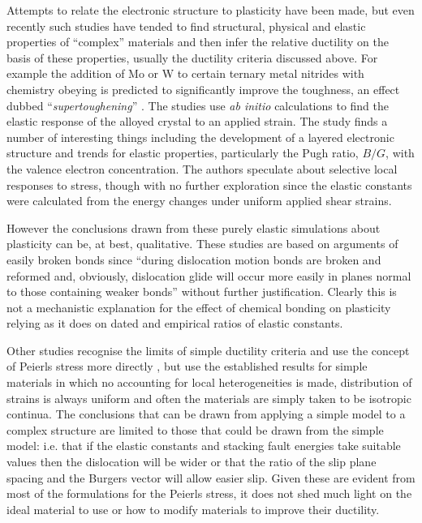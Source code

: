 Attempts to relate the electronic structure to plasticity have been made, but even recently such studies have tended to find structural, physical and elastic properties of ``complex'' materials and then infer the relative ductility on the basis of these properties, usually the ductility criteria discussed above. For example  the addition of Mo or W to certain ternary metal nitrides with chemistry obeying  is predicted to significantly improve the toughness, an effect dubbed ``\emph{supertoughening}'' \cite{Sangiovanni2010,Sangiovanni2011}. The studies use \emph{ab initio} calculations to find the elastic response of the alloyed crystal to an applied strain. The study finds a number of interesting things including the development of a layered electronic structure and trends for elastic properties, particularly the Pugh ratio, $B/G$, with the valence electron concentration. The authors speculate about selective local responses to stress, though with no further exploration since the elastic constants were calculated from the energy changes under uniform applied shear strains.

However the conclusions drawn from these purely elastic simulations about plasticity can be, at best, qualitative. These studies are based on arguments of easily broken bonds since ``during dislocation motion bonds are broken and reformed and, obviously, dislocation glide will occur more easily in planes normal to those containing weaker bonds'' \cite{Sangiovanni2011} without further justification. Clearly this is not a mechanistic explanation for the effect of chemical bonding on plasticity relying as it does on dated and empirical ratios of elastic constants.


Other studies recognise the limits of simple ductility criteria and use the concept of Peierls stress more directly \cite{Music2008,Emmerlich2009,Gouriet2015}, but use the established results for simple materials in which no accounting for local heterogeneities is made, distribution of strains is always uniform and often the materials are simply taken to be isotropic continua. The conclusions that can be drawn from applying a simple model to a complex structure are limited to those that could be drawn from the simple model: i.e. that if the elastic constants and stacking fault energies take suitable values then the dislocation will be wider or that the ratio of the slip plane spacing and the Burgers vector will allow easier slip. Given these are evident from most of the formulations for the Peierls stress, it does not shed much light on the ideal material to use or how to modify materials to improve their ductility.


